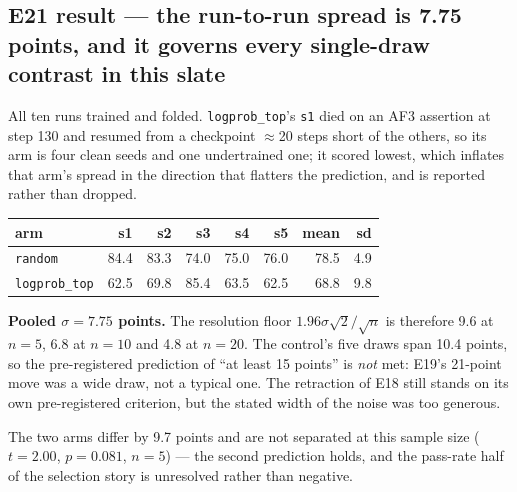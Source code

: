 \subsection*{E21 result --- the run-to-run spread is 7.75 points, and it
governs every single-draw contrast in this slate}

All ten runs trained and folded. \texttt{logprob\_top}'s \texttt{s1} died on an
AF3 assertion at step 130 and resumed from a checkpoint \(\approx\)20 steps
short of the others, so its arm is four clean seeds and one undertrained one;
it scored lowest, which inflates that arm's spread in the direction that
flatters the prediction, and is reported rather than dropped.

\begin{center}
\begin{tabular}{lrrrrrrr}
\toprule
arm & s1 & s2 & s3 & s4 & s5 & mean & sd \\
\midrule
\texttt{random}      & 84.4 & 83.3 & 74.0 & 75.0 & 76.0 & 78.5 & 4.9 \\
\texttt{logprob\_top} & 62.5 & 69.8 & 85.4 & 63.5 & 62.5 & 68.8 & 9.8 \\
\bottomrule
\end{tabular}
\end{center}

\textbf{Pooled \(\sigma = 7.75\) points.} The resolution floor
\(1.96\sigma\sqrt{2}/\sqrt{n}\) is therefore \SI{9.6}{\points} at \(n=5\),
\SI{6.8}{\points} at \(n=10\) and \SI{4.8}{\points} at \(n=20\). The control's
five draws span 10.4 points, so the pre-registered prediction of ``at least 15
points'' is \emph{not} met: E19's 21-point move was a wide draw, not a typical
one. The retraction of E18 still stands on its own pre-registered criterion,
but the stated width of the noise was too generous.

The two arms differ by 9.7 points and are not separated at this sample size
(\(t = 2.00\), \(p = 0.081\), \(n=5\)) --- the second prediction holds, and the
pass-rate half of the selection story is unresolved rather than negative.


